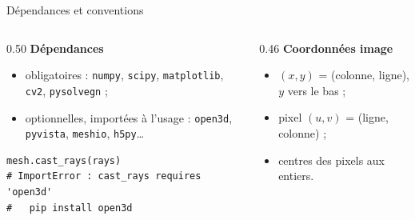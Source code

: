 \documentclass[aspectratio=169,11pt]{beamer}
\begin{document}
\begin{frame}[fragile]{Dépendances et conventions}
  \begin{columns}[T]
    \begin{column}{0.50\textwidth}\small
      \textbf{Dépendances}
      \begin{itemize}
        \item obligatoires : \texttt{numpy}, \texttt{scipy}, \texttt{matplotlib},
              \texttt{cv2}, \texttt{pysolvegn} ;
        \item optionnelles, importées à l'usage : \texttt{open3d}, \texttt{pyvista},
              \texttt{meshio}, \texttt{h5py}\dots
      \end{itemize}
\begin{lstlisting}
mesh.cast_rays(rays)
# ImportError : cast_rays requires 'open3d'
#   pip install open3d
\end{lstlisting}
    \end{column}
    \begin{column}{0.46\textwidth}\small
      \textbf{Coordonnées image}
      \begin{itemize}
        \item $(x, y)$ = (colonne, ligne), $y$ vers le bas ;
        \item pixel $(u, v)$ = (ligne, colonne) ;
        \item centres des pixels aux entiers.
      \end{itemize}
      \medskip
      \centering
    \end{column}
  \end{columns}
\end{frame}
 
\end{document}
